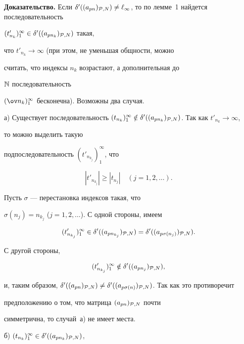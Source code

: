 {\bf Доказательство.} Если $\delta'((a_{pn})_{{\cal


P},N})\ne\ell_\infty$, то по лемме~1 найдется последовательность


$(t'_{n_k})_1^\infty\in\delta'((a_{pn_k})_{{\cal P},N})$ такая,


что $t'_{n_k}\to\infty$ (при этом, не уменьшая общности, можно


считать, что индексы $n_k$ возрастают, а дополнительная до


$\Bbb N$ последовательность


$(\ov n_k)_1^\infty$ бесконечна). Возможны два случая.





а) Существует последовательность $(t_{n_k})_1^\infty\notin


\delta'((a_{pn_k})_{{\cal P},N})$. Так как $t'_{n_k}\to\infty$,


то можно выделить такую


подпоследовательность $(t'_{n_{k_j}})_1^\infty$, что


$$


|t'_{n_{k_j}}|\geq |t_{n_j}| \quad (j=1,2,\dots).


$$


Пусть $\sigma$ --- перестановка индексов такая, что


$\sigma(n_j)=n_{k_j}$ ($j=1,2,\dotsc$). С одной стороны, имеем


$$


(t'_{n_{k_j}})_1^\infty\in


\delta'((a_{pn_{k_j}})_{{\cal  P},N})=


\delta'((a_{p\sigma(n_j)})_{{\cal P},N}).


$$


С другой стороны,


$$


(t'_{n_{k_j}})_1^\infty\notin \delta'((a_{pn_j})_{{\cal P},N}),


$$


и, таким образом, $\delta'((a_{pn})_{{\cal P},N})\ne


\delta'((a_{p\sigma(n)})_{{\cal P},N})$. Так как это противоречит


предположению о том, что матрица $(a_{pn})_{{\cal P},N}$ почти


симметрична, то случай~а) не имеет места.





б) $(t_{n_k})_1^\infty\in \delta'((a_{pn_k})_{{\cal P},N})$,


